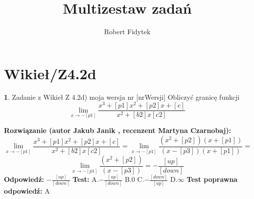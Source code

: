 \documentclass[12pt, a4paper]{article}
\title{Multizestaw zadań}
\author{Robert Fidytek}
\date{}
\theoremstyle{definition} %
\newtheorem{zad}{}
\newcommand{\kategoria}[1]{\section{#1}} %
\newcommand{\zadStart}[1]{\begin{zad}#1\newline} %
\newcommand{\zadStop}{\end{zad}}   %
\newcommand{\rozwStart}[2]{\noindent \textbf{Rozwiązanie (autor #1 , recenzent #2): }\newline} %
\newcommand{\rozwStop}{\newline}                                            %
\newcommand{\odpStart}{\noindent \textbf{Odpowiedź:}\newline}    %
\newcommand{\odpStop}{\newline}                                             %
\newcommand{\testStart}{\noindent \textbf{Test:}\newline} %
\newcommand{\testStop}{\newline} %
\newcommand{\kluczStart}{\noindent \textbf{Test poprawna odpowiedź:}\newline} %
\newcommand{\kluczStop}{\newline} %
\begin{document}
\maketitle


\kategoria{Wikieł/Z4.2d}
\zadStart{Zadanie z Wikieł Z 4.2d) moja wersja nr [nrWersji]}
Obliczyć granicę funkcji $$\lim_{x \to -[p1]} \frac{x^3+[p1]x^2 +[p2]x+[c]}{x^2 + [b2]x [c2]}$$
\zadStop
\rozwStart{Jakub Janik}{Martyna Czarnobaj}
$$\lim_{x \to -[p1]} \frac{x^3+[p1]x^2 +[p2]x+[c]}{x^2 + [b2]x [c2]}=\lim_{x \to -[p1]} \frac{(x^2+[p2])(x+[p1])}{(x-[p3])(x+[p1])}=$$
$$\lim_{x \to -[p1]} \frac{(x^2+[p2])}{(x-[p3])}=-\frac{[up]}{[down]}$$
\rozwStop
\odpStart
$-\frac{[up]}{[down]}$
\odpStop
\testStart
A.$-\frac{[up]}{[down]}$
B.$0$
C.$-\frac{[down]}{[up]}$
D.$\infty$
\testStop
\kluczStart
A
\kluczStop
\end{document}
